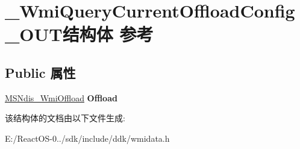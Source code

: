 \hypertarget{struct___wmi_query_current_offload_config___o_u_t}{}\section{\+\_\+\+Wmi\+Query\+Current\+Offload\+Config\+\_\+\+O\+U\+T结构体 参考}
\label{struct___wmi_query_current_offload_config___o_u_t}
\subsection*{Public 属性}
\begin{DoxyCompactItemize}
\item 
\mbox{\label{struct___wmi_query_current_offload_config___o_u_t_a4bc887658e1dc6324362a940a54ce4d7}} 
\hyperlink{struct___m_s_ndis___wmi_offload}{M\+S\+Ndis\+\_\+\+Wmi\+Offload} {\bfseries Offload}
\end{DoxyCompactItemize}


该结构体的文档由以下文件生成\+:\begin{DoxyCompactItemize}
\item 
E\+:/\+React\+O\+S-\/0../sdk/include/ddk/wmidata.\+h\end{DoxyCompactItemize}
